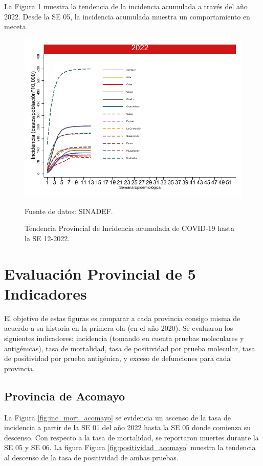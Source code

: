 \documentclass[12pt,a4paper,openany]{book}
\begin{document}
La Figura \ref{fig:incidencia_provincial} muestra la tendencia de la incidencia acumulada a través del año 2022. Desde la SE 05, la incidencia acumulada muestra un comportamiento en meceta. 
%
\begin{figure}[h]
	\caption{Tendencia Provincial de Incidencia acumulada de COVID-19 hasta la SE 12-2022. }\label{fig:incidencia_provincial}
	\begin{center}
		\includegraphics[width=0.60\linewidth]{../figuras/incidencia_provincial_acumulada_2022.pdf}
	\end{center}
	{\footnotesize {Fuente de datos: SINADEF.}}
\end{figure}

\clearpage
	
\section*{Evaluación Provincial de 5 Indicadores}
		\noindent El objetivo de estas figuras es comparar a cada provincia consigo misma de acuerdo a su historia  en la primera ola (en el año 2020). Se evaluaron los siguientes indicadores: incidencia (tomando en cuenta pruebas moleculares y antigénicas), tasa de mortalidad, tasa de positividad por prueba molecular, tasa de positividad por prueba antigénica, y exceso de defunciones para cada provincia.
		
		\subsection*{Provincia de Acomayo}
		\noindent La Figura \ref{fig:inc_mort_acomayo} se evidencia un ascenso de la tasa de incidencia a partir de la SE 01 del año 2022 hasta la SE 05 donde comienza su descenso. Con respecto a la tasa de mortalidad, se reportaron muertes durante la SE 05 y SE 06. 
		\noindent La figura Figura \ref{fig:positividad_acomayo} muestra la tendencia al descenso de la tasa de positividad de ambas pruebas. 
		
\end{document}
